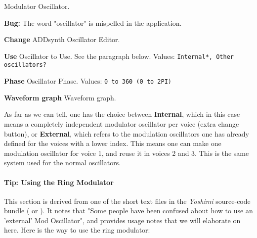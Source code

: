    Modulator Oscillator.

   \textbf{Bug:}
   The word "oscillator" is mispelled in the application.

   \begin{enumber}
      \item \textbf{Change}
         ADDsynth Oscillator Editor.
      \item \textbf{Use}
         Oscillator to Use.
         See the paragraph below.
         Values: \texttt{Internal*, Other oscillators?}
      \item \textbf{Phase}
         Oscillator Phase.
         Values: \texttt{0 to 360 (0 to 2PI)}
      \item \textbf{Waveform graph}
         Waveform graph.
   \end{enumber}

   As far as we can tell, one has the choice between \textbf{Internal},
   which in this case means a completely independent modulator oscillator
   per voice (extra change button), or \textbf{External}, which refers to
   the modulation oscillators one has already defined for the voices with a
   lower index.
   This means one can make one modulation oscillator for voice 1, and reuse it
   in voices 2 and 3.  This is the same system used for the normal
   oscillators.

\paragraph{Tip: Using the Ring Modulator}
\label{paragraph:tip_using_the_ring_modulator}

   This section is derived from one of the short text files in the
   \textsl{Yoshimi} source-code bundle (\cite{yoshimi} or \cite{yoshimi2}).
   It notes that "Some people have
   been confused about how to use an 'external' Mod Oscillator", and
   provides usage notes that we will elaborate on here.  Here is the way to
   use the ring modulator:

